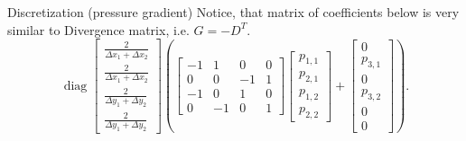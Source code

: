 \documentclass{beamer}
\begin{document}
	
	\begin{frame}{Discretization (pressure gradient)}
	Notice, that matrix of coefficients below is very similar to Divergence matrix, i.e. $G=-D^T$.
	\begin{equation}\label{eqn:gradient-matrix}
	\operatorname{diag}\left[\begin{array}{cccccc}
	\frac{2}{\Delta x_1+\Delta x_2} \\
	\frac{2}{\Delta x_1+\Delta x_2} \\
	\frac{2}{\Delta y_1+\Delta y_2} \\
	\frac{2}{\Delta y_1+\Delta y_2}
	\end{array}\right]
	\left(\left[\begin{array}{rrrr}
	-1 & 1 & 0 & 0 \\
	0 & 0 & -1 & 1 \\
	-1 & 0 & 1 & 0 \\
	0 & -1 & 0 & 1
	\end{array}\right]
	\begin{bmatrix}{}
	  p_{1,1} \\
	  p_{2,1} \\
	  p_{1,2} \\
	  p_{2,2} 
	\end{bmatrix}
	+\left[\begin{array}{c}
	0 \\
	p_{3,1} \\
	0 \\
	 p_{3,2} \\
	0 \\
	0
	\end{array}\right]\right).
	\end{equation}
	\end{frame}
	
	

	
\end{document}
